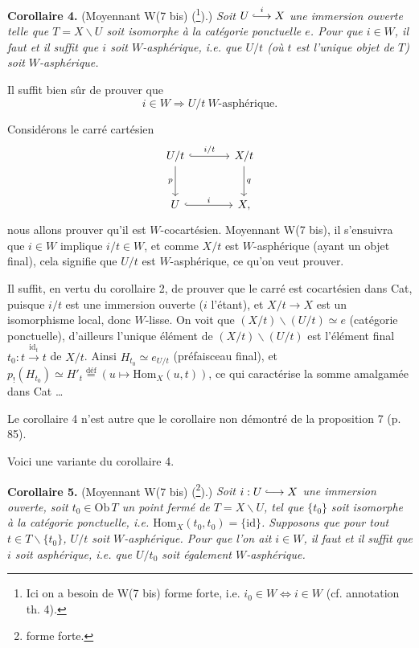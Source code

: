 \documentclass[11pt]{article}
\newcommand{\printedpage}[1]{\marginpar{\footnotesize p.~#1}}
\newcommand{\msp}[1]{\marginpar{\footnotesize [#1]}}
\newcommand{\hto}[1][]{\overset{#1}{\lhook\joinrel\longrightarrow}}
\begin{document}
\printedpage{103}

\noindent\textbf{Corollaire 4.} (Moyennant W(7 bis) (\footnote[104]{Ici on a besoin de W(7 bis) forme forte, i.e. $i_0\in W \iff i\in W$ (cf. annotation th. 4).}).) \textit{Soit $U \hto[i] X$ une immersion ouverte telle que $T=X\backslash U$ soit isomorphe à la catégorie ponctuelle $e$. Pour que $i\in W$, il faut et il suffit que $i$ soit $W$-asphérique, i.e. que $U/t$ (où $t$ est l'unique objet de $T$) soit $W$-asphérique.}

Il suffit bien sûr de prouver que
\[
i\in W \Longrightarrow U/t \ W\text{-asphérique.}
\]

\msp{page 150}
Considérons le carré cartésien
\[
\begin{tikzcd}[row sep=large,column sep=large]
U/t \arrow[r, hook, "i/t"] \arrow[d, "p"'] & X/t \arrow[d, "q"] \\
U \arrow[r, hook, "i"] & X,
\end{tikzcd}
\]
nous allons prouver qu'il est $W$-cocartésien. Moyennant W(7 bis), il s'ensuivra que $i\in W$ implique $i/t\in W$, et comme $X/t$ est $W$-asphérique (ayant un objet final), cela signifie que $U/t$ est $W$-asphérique, ce qu'on veut prouver.

Il suffit, en vertu du corollaire 2, de prouver que le carré est cocartésien dans Cat, puisque $i/t$ est une immersion ouverte ($i$ l'étant), et $X/t\longrightarrow X$ est un isomorphisme local, donc $W$-lisse. On voit que $(X/t)\backslash(U/t)\simeq e$ (catégorie ponctuelle), d'ailleurs l'unique élément de $(X/t)\backslash(U/t)$ est l'élément final $t_0 : t\xrightarrow{\mathrm{id}_t} t$ de $X/t$. Ainsi $H_{t_0}\simeq e_{U/t}$ (préfaisceau final), et $p_{!}(H_{t_0})\simeq H'_t \overset{\text{déf}}{=} (u\longmapsto \mathrm{Hom}_X(u,t))$, ce qui caractérise la somme amalgamée dans Cat
\dots

Le corollaire 4 n'est autre que le corollaire non démontré de la proposition 7 (p. 85).

Voici une variante du corollaire 4.

\noindent\textbf{Corollaire 5.} (Moyennant W(7 bis) (\footnote[105]{forme forte.}).) \textit{Soit $i : U \hto X$ une immersion ouverte, soit $t_0\in\mathrm{Ob}\,T$ un point \textup{fermé} de $T=X\backslash U$, tel que $\{t_0\}$}
\msp{page 151}
\textit{soit isomorphe à la catégorie ponctuelle, i.e. $\mathrm{Hom}_X(t_0,t_0)=\{\mathrm{id}\}$. Supposons que pour tout $t\in T\backslash\{t_0\}$, $U/t$ soit $W$-asphérique. Pour que l'on ait $i\in W$, il faut et il suffit que $i$ soit asphérique, i.e. que $U/t_0$ soit également $W$-asphérique.}
\end{document}
